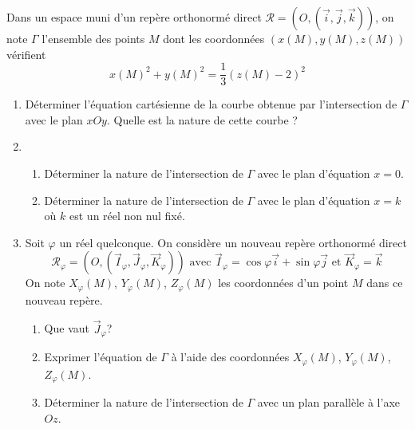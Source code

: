 Dans un espace muni d'un repère orthonormé direct $\mathcal R = (O,(\overrightarrow i ,\overrightarrow j ,\overrightarrow k))$, on note $\Gamma$ l'ensemble des points $M$ dont les coordonnées $(x(M),y(M),z(M))$ vérifient
\begin{displaymath}
 x(M)^2 + y(M)^2 = \frac{1}{3}(z(M)-2)^2
\end{displaymath}
\begin{enumerate}
 \item Déterminer l'équation cartésienne de la courbe obtenue par l'intersection de $\Gamma$ avec le plan $xOy$. Quelle est la nature de cette courbe ?

 \item 
\begin{enumerate}
 \item Déterminer la nature de l'intersection de $\Gamma$ avec le plan d'équation $x=0$.
 \item Déterminer la nature de l'intersection de $\Gamma$ avec le plan d'équation $x=k$ où $k$ est un réel non nul fixé.
\end{enumerate}

 \item Soit $\varphi$ un réel quelconque. On considère un nouveau repère orthonormé direct
\begin{displaymath}
\mathcal R_\varphi = (O,(\overrightarrow I_\varphi ,\overrightarrow J_\varphi ,\overrightarrow K_\varphi))
\text{ avec }
 \overrightarrow I_\varphi = \cos \varphi \overrightarrow i + \sin \varphi \overrightarrow j  
\text{ et } \overrightarrow K_\varphi = \overrightarrow k
\end{displaymath}
On note $X_\varphi (M)$, $Y_\varphi (M)$, $Z_\varphi (M)$ les coordonnées d'un point $M$ dans ce nouveau repère.
\begin{enumerate}
 \item Que vaut $\overrightarrow J_\varphi$? 
 \item Exprimer l'équation de $\Gamma$ à l'aide des coordonnées $X_\varphi(M)$, $Y_\varphi(M)$, $Z_\varphi(M)$.
 \item Déterminer la nature de l'intersection de $\Gamma$ avec un plan parallèle à l'axe $Oz$.
\end{enumerate}


\end{enumerate}
